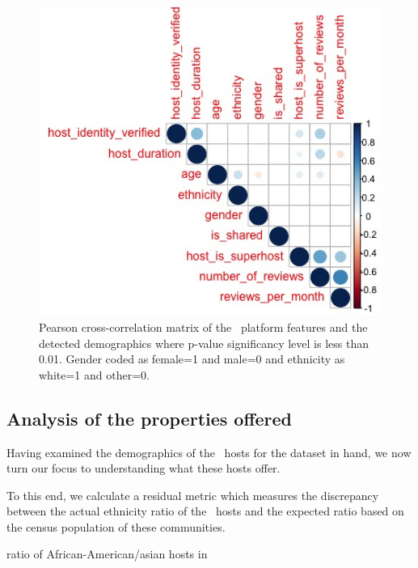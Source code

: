  
\begin{figure}[h]
\begin{center}
\includegraphics[scale=0.5]{pics/corplot.jpeg}
\caption{ Pearson cross-correlation matrix of the \ab \ platform features and the detected demographics where p-value significancy level is less than 0.01. Gender coded as female=1 and male=0 and ethnicity as white=1 and other=0. }
\label{fig:correlation}
\end{center}
\end{figure}



\subsection{Analysis of the properties offered }

Having examined the demographics of the \ab \ hosts for the dataset in hand, we now turn our focus to understanding what these hosts offer.   %

To this end, we calculate a residual metric which measures the discrepancy between the actual ethnicity ratio of the \ab \ hosts and the expected ratio based on the census population of these communities.

ratio of African-American/asian hosts in \ab \ 

